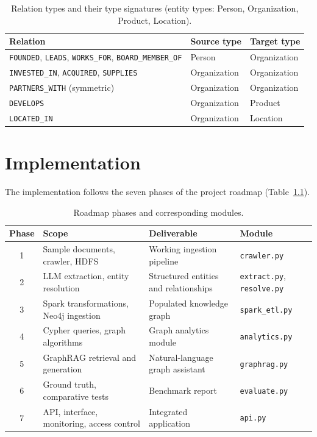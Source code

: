 \documentclass[11pt,a4paper]{report}
\begin{document}
\begin{table}[ht]
\centering
\small
\begin{tabular}{lll}
\toprule
\textbf{Relation} & \textbf{Source type} & \textbf{Target type} \\
\midrule
\texttt{FOUNDED}, \texttt{LEADS}, \texttt{WORKS\_FOR}, \texttt{BOARD\_MEMBER\_OF} & Person & Organization \\
\texttt{INVESTED\_IN}, \texttt{ACQUIRED}, \texttt{SUPPLIES} & Organization & Organization \\
\texttt{PARTNERS\_WITH} (symmetric) & Organization & Organization \\
\texttt{DEVELOPS} & Organization & Product \\
\texttt{LOCATED\_IN} & Organization & Location \\
\bottomrule
\end{tabular}
\caption{Relation types and their type signatures (entity types: Person, Organization, Product, Location).}
\label{tab:schema}
\end{table}

\chapter{Implementation}\label{ch:impl}
The implementation follows the seven phases of the project roadmap (Table~\ref{tab:phases}).

\begin{table}[ht]
\centering
\small
\begin{tabularx}{\linewidth}{clXl}
\toprule
\textbf{Phase} & \textbf{Scope} & \textbf{Deliverable} & \textbf{Module} \\
\midrule
1 & Sample documents, crawler, HDFS & Working ingestion pipeline & \texttt{crawler.py} \\
2 & LLM extraction, entity resolution & Structured entities and relationships & \texttt{extract.py}, \texttt{resolve.py} \\
3 & Spark transformations, Neo4j ingestion & Populated knowledge graph & \texttt{spark\_etl.py} \\
4 & Cypher queries, graph algorithms & Graph analytics module & \texttt{analytics.py} \\
5 & GraphRAG retrieval and generation & Natural-language graph assistant & \texttt{graphrag.py} \\
6 & Ground truth, comparative tests & Benchmark report & \texttt{evaluate.py} \\
7 & API, interface, monitoring, access control & Integrated application & \texttt{api.py} \\
\bottomrule
\end{tabularx}
\caption{Roadmap phases and corresponding modules.}
\label{tab:phases}
\end{table}
\end{document}
